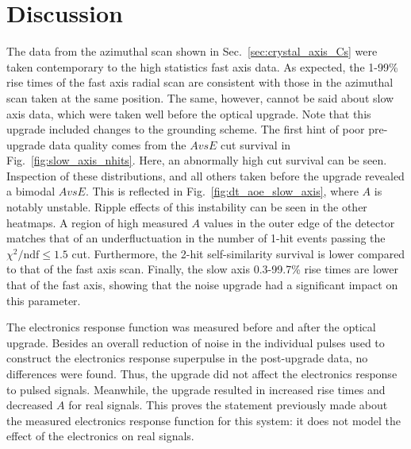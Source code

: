 \section{Discussion}
The data from the azimuthal scan shown in Sec.~\ref{sec:crystal_axis_Cs} were taken contemporary to the high statistics fast axis data. As expected, the 1-99\% rise times of the fast axis radial scan are consistent with those in the azimuthal scan taken at the same position. The same, however, cannot be said about slow axis data, which were taken well before the optical upgrade. Note that this upgrade included changes to the grounding scheme. The first hint of poor pre-upgrade data quality comes from the $AvsE$ cut survival in Fig.~\ref{fig:slow_axis_nhits}. Here, an abnormally high cut survival can be seen. Inspection of these distributions, and all others taken before the upgrade revealed a bimodal $AvsE$. This is reflected in Fig.~\ref{fig:dt_aoe_slow_axis}, where $A$ is notably unstable. Ripple effects of this instability can be seen in the other heatmaps. A region of high measured $A$ values in the outer edge of the detector matches that of an underfluctuation in the number of 1-hit events passing the $\chi^2/\text{ndf}\le1.5$ cut. Furthermore, the 2-hit self-similarity survival is lower compared to that of the fast axis scan. Finally, the slow axis 0.3-99.7\% rise times are lower that of the fast axis, showing that the noise upgrade had a significant impact on this parameter. 

The electronics response function was measured before and after the optical upgrade. Besides an overall reduction of noise in the individual pulses used to construct the electronics response superpulse in the post-upgrade data, no differences were found. Thus, the upgrade did not affect the electronics response to pulsed signals. Meanwhile, the upgrade resulted in increased rise times and decreased $A$ for real signals. This proves the statement previously made about the measured electronics response function for this system: it does not model the effect of the electronics on real signals. 

